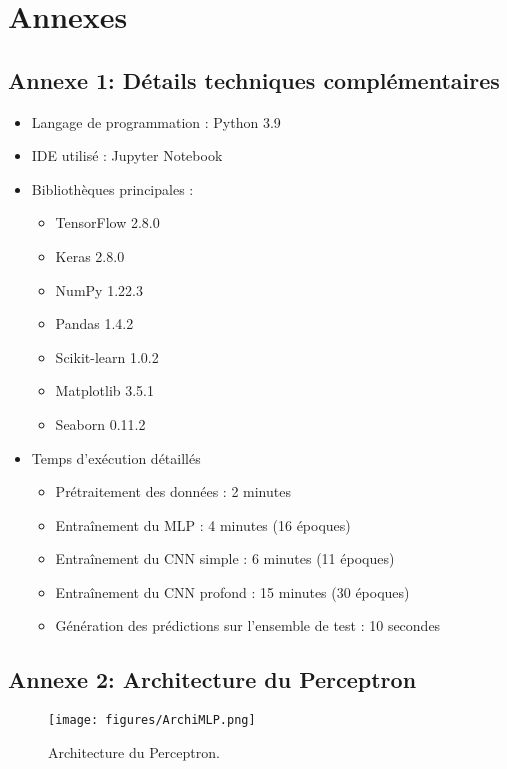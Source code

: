 
\chapter*{Annexes}

\section*{Annexe 1: Détails techniques complémentaires}

\begin{itemize}
\item Langage de programmation : Python 3.9
\item IDE utilisé : Jupyter Notebook
\item Bibliothèques principales :
\begin{itemize}
\item TensorFlow 2.8.0
\item Keras 2.8.0
\item NumPy 1.22.3
\item Pandas 1.4.2
\item Scikit-learn 1.0.2
\item Matplotlib 3.5.1
\item Seaborn 0.11.2
\end{itemize}
\item Temps d'exécution détaillés
\begin{itemize}
\item Prétraitement des données : 2 minutes
\item Entraînement du MLP : 4 minutes (16 époques)
\item Entraînement du CNN simple : 6 minutes (11 époques)
\item Entraînement du CNN profond : 15 minutes (30 époques)
\item Génération des prédictions sur l'ensemble de test : 10 secondes
\end{itemize}
\end{itemize}


\section*{Annexe 2: Architecture du Perceptron}
\label{sec:annexe2}
\begin{figure}[H]
\centering
\texttt{[image: figures/ArchiMLP.png]}
\caption{Architecture du Perceptron.}
\label{fig:Architecture CNN Simple}
\end{figure}




